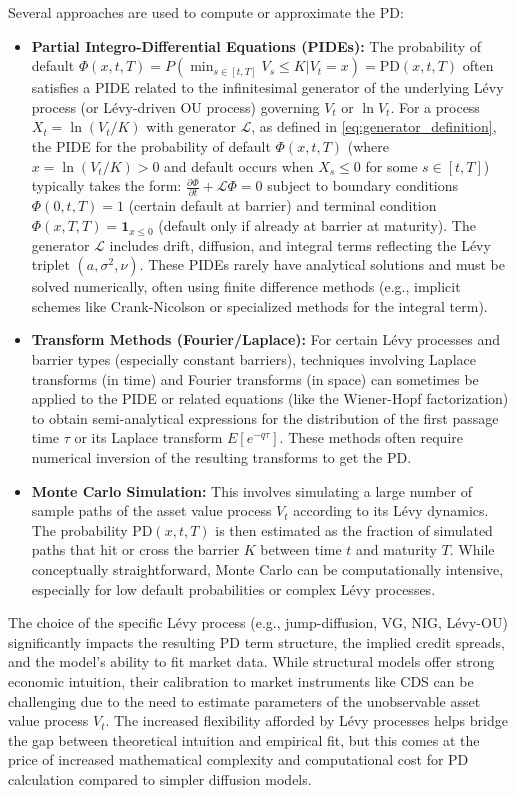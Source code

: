 \documentclass[11pt,twoside,openright]{report}
\begin{document}
Several approaches are used to compute or approximate the PD:
\begin{itemize}
    \item \textbf{Partial Integro-Differential Equations (PIDEs):} The probability of default $\Phi(x, t, T) = P(\min_{s \in [t,T]} V_s \le K | V_t = x) = \text{PD}(x, t, T)$ often satisfies a PIDE related to the infinitesimal generator of the underlying Lévy process (or Lévy-driven OU process) governing $V_t$ or $\ln V_t$. For a process $X_t = \ln(V_t / K)$ with generator $\mathcal{L}$, as defined in \eqref{eq:generator_definition}, the PIDE for the probability of default $\Phi(x, t, T)$ (where $x = \ln(V_t / K) > 0$ and default occurs when $X_s \le 0$ for some $s \in [t,T]$) typically takes the form: $\frac{\partial \Phi}{\partial t} + \mathcal{L} \Phi = 0$ subject to boundary conditions $\Phi(0, t, T) = 1$ (certain default at barrier) and terminal condition $\Phi(x, T, T) = \mathbf{1}_{x \le 0}$ (default only if already at barrier at maturity). The generator $\mathcal{L}$ includes drift, diffusion, and integral terms reflecting the Lévy triplet $(a, \sigma^2, \nu)$.
    These PIDEs rarely have analytical solutions and must be solved numerically, often using finite difference methods (e.g., implicit schemes like Crank-Nicolson or specialized methods for the integral term).

    \item \textbf{Transform Methods (Fourier/Laplace):} For certain Lévy processes and barrier types (especially constant barriers), techniques involving Laplace transforms (in time) and Fourier transforms (in space) can sometimes be applied to the PIDE or related equations (like the Wiener-Hopf factorization) to obtain semi-analytical expressions for the distribution of the first passage time $\tau$ or its Laplace transform $E[e^{-q\tau}]$. These methods often require numerical inversion of the resulting transforms to get the PD.

    \item \textbf{Monte Carlo Simulation:} This involves simulating a large number of sample paths of the asset value process $V_t$ according to its Lévy dynamics. The probability $\text{PD}(x, t, T)$ is then estimated as the fraction of simulated paths that hit or cross the barrier $K$ between time $t$ and maturity $T$. While conceptually straightforward, Monte Carlo can be computationally intensive, especially for low default probabilities or complex Lévy processes.
\end{itemize}
The choice of the specific Lévy process (e.g., jump-diffusion, VG, NIG, Lévy-OU) significantly impacts the resulting PD term structure, the implied credit spreads, and the model's ability to fit market data. While structural models offer strong economic intuition, their calibration to market instruments like CDS can be challenging due to the need to estimate parameters of the unobservable asset value process $V_t$. The increased flexibility afforded by Lévy processes helps bridge the gap between theoretical intuition and empirical fit, but this comes at the price of increased mathematical complexity and computational cost for PD calculation compared to simpler diffusion models.
\end{document}
